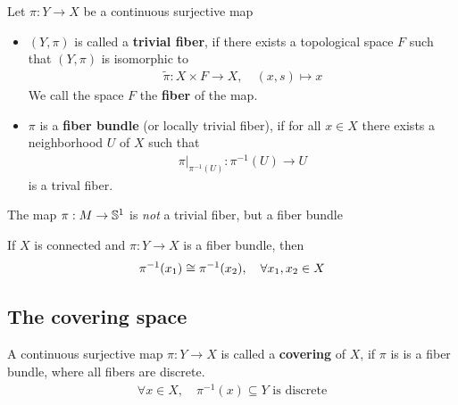 \begin{dfn}[]
  Let $\pi: Y \to X$ be a continuous surjective map
  \begin{itemize}
    \item $(Y,\pi)$ is called a \textbf{trivial fiber}, if there exists a topological space $F$ such that $(Y,\pi)$ is isomorphic to
      \begin{align*}
        \tilde{\pi}: X \times F \to  X, \quad (x,s) \mapsto x
      \end{align*}
      We call the space $F$ the \textbf{fiber} of the map.
    \item $\pi$ is a \textbf{fiber bundle} (or locally trivial fiber), if for all $x \in X$ there exists a neighborhood $U$ of $X$ such that
      \begin{align*}
        \pi|_{\pi^{-1}(U)} : \pi^{-1}(U) \to U
      \end{align*}
      is a trival fiber.
  \end{itemize}
\end{dfn}

The map $\pi: M \to  \mathbb{S}^{1}$ is \emph{not} a trivial fiber, but a fiber bundle

\begin{rem}[]
  If $X$ is connected and $\pi: Y \to X$ is a fiber bundle, then
  \begin{align*}
    \pi^{-1}(x_1) \cong \pi^{-1}(x_2), \quad \forall x_1, x_2 \in X
  \end{align*}
\end{rem}

\subsection{The covering space}
\begin{dfn}[] \label{dfn:covering}
  A continuous surjective map $\pi: Y \to  X$ is called a \textbf{covering} of $X$, if $\pi$ is is a fiber bundle, where all fibers are discrete.
  \begin{align*}
    \forall x \in X,\quad \pi^{-1}(x) \subseteq Y \text{ is discrete}
  \end{align*}
\end{dfn}


